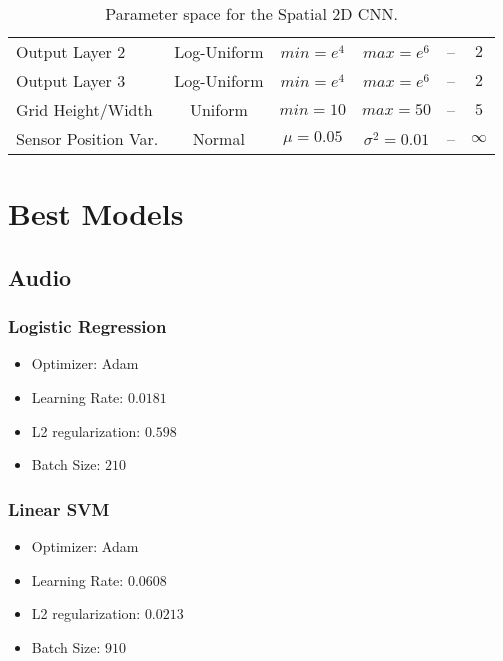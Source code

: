 \begin{table}[h]
{\begin{tabular}{ l | c | c | c | c | c }
      Output Layer 2              &  Log-Uniform  & $min=e^{4}$   & $max=e^{6}$       &  --    & $2$         \\
      Output Layer 3              &  Log-Uniform  & $min=e^{4}$   & $max=e^{6}$       &  --    & $2$         \\
      Grid Height/Width           &    Uniform    & $min=10$      & $max=50$           &  --    & $5$         \\
      Sensor Position Var. \footnotemark &    Normal     & $\mu = 0.05$  & $\sigma^2 = 0.01$ &  --    & $\infty$    \\ 
     \hline
  \end{tabular}}
  \caption{Parameter space for the Spatial 2D CNN.}
\end{table}


\section{Best Models}

\subsection{Audio}

\subsubsection{Logistic Regression}

\begin{itemize}
\item Optimizer: Adam
\item Learning Rate: $0.0181$
\item L2 regularization: $0.598$
\item Batch Size: $210$
\end{itemize}

\subsubsection{Linear SVM}

\begin{itemize}
\item Optimizer: Adam
\item Learning Rate: $0.0608$
\item L2 regularization: $0.0213$
\item Batch Size: $910$
\end{itemize}

